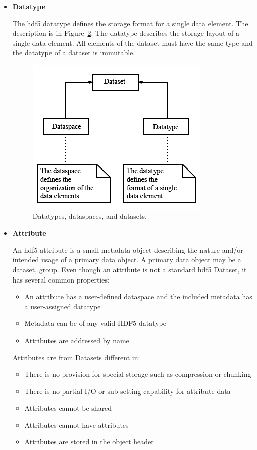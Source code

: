 \begin{itemize}
\begin{figure}[h]
\begin{center}
				\caption{Example of HDF5 file with EEGBase format in HDFView 2.11- the Dataset with name T6 (EEG channel) with Dataspace (array of 1414260 double numbers) and four attributes.}
				\label{dataset_figure}
			\end{center}
		\end{figure}
	\item \textbf{Datatype}
	
The \gls{hdf5} datatype defines the storage format for a single data element. The description is in Figure~\ref{datatype}. The datatype describes the storage layout of a single data element. All elements of the dataset must have the same type and the datatype of a dataset is immutable.
	\begin{figure}[h]
	\centering
		\includegraphics[scale=0.7]{obrazky/datatype.jpg}
		\caption{Datatypes, dataspaces, and datasets. \cite{hdf}}
		\label{datatype}	
\end{figure}

\newpage
	\item \textbf{Attribute}
	
	An \gls{hdf5} attribute is a small metadata object describing the nature and/or intended usage of a primary data object. A primary data object may be a dataset, group. Even though an attribute is not a standard \gls{hdf5} Dataset, it has several common properties: \cite{hdf}
	\begin{itemize}
\item An attribute has a user-defined dataspace and the included metadata has a user-assigned datatype
\item Metadata can be of any valid HDF5 datatype
\item Attributes are addressed by name
	\end{itemize} 
	Attributes are from Datasets different in:
		\begin{itemize}
			\item There is no provision for special storage such as compression or chunking
			\item There is no partial I/O or sub-setting capability for attribute data
			\item Attributes cannot be shared
			\item Attributes cannot have attributes
			\item Attributes are stored in the object header
		\end{itemize} 
\end{itemize}

